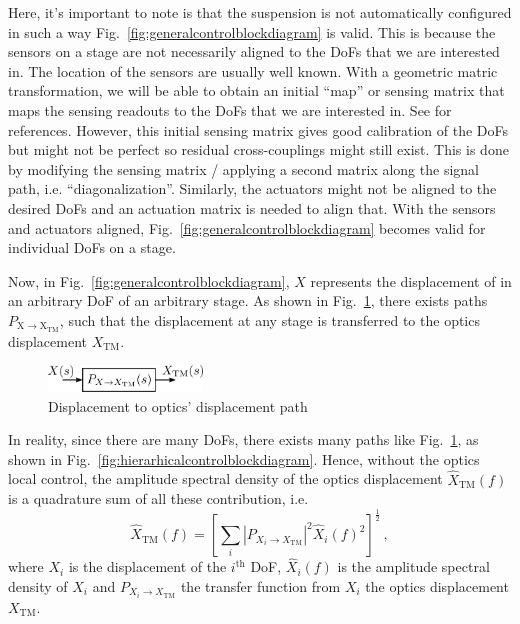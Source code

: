 Here, it's important to note is that the suspension is not automatically configured in such a way Fig.~\ref{fig:generalcontrolblockdiagram} is valid.
This is because the sensors on a stage are not necessarily aligned to the DoFs that we are interested in.
The location of the sensors are usually well known.
With a geometric matric transformation, we will be able to obtain an initial ``map'' or sensing matrix that maps the sensing readouts to the DoFs that we are interested in.
See \cite{bs_suspension_diagonalization, sr_suspension_diagonalization, all_of_the_vibration,  sensing_matrices_oplev} for references.
However, this initial sensing matrix gives good calibration of the DoFs but might not be perfect so residual cross-couplings might still exist.
This is done by modifying the sensing matrix / applying a second matrix along the signal path, i.e. ``diagonalization''.
Similarly, the actuators might not be aligned to the desired DoFs and an actuation matrix is needed to align that.
With the sensors and actuators aligned, Fig.~\ref{fig:generalcontrolblockdiagram} becomes valid for individual DoFs on a stage.

Now, in Fig.~\ref{fig:generalcontrolblockdiagram}, $X$ represents the displacement of in an arbitrary DoF of an arbitrary stage.
As shown in Fig.~\ref{fig:displacementtooptics}, there exists paths $P_\mathrm{X\to X_\mathrm{TM}}$, such that the displacement at any stage is transferred to the optics displacement $X_\mathrm{TM}$.
\begin{figure}[!h]
	\centering
	\includegraphics[width=41mm]{figures/displacement_to_optics}
	\caption{Displacement to optics' displacement path}
	\label{fig:displacementtooptics}
\end{figure}
In reality, since there are many DoFs, there exists many paths like Fig.~\ref{fig:displacementtooptics}, as shown in Fig.~\ref{fig:hierarhicalcontrolblockdiagram}.
Hence, without the optics local control, the amplitude spectral density of the optics displacement $\hat{X}_\mathrm{TM}(f)$ is a quadrature sum of all these contribution, i.e.
\begin{equation}
	\hat{X}_\mathrm{TM}(f)=\left[\sum_i\left\lvert P_{X_i\to X_\mathrm{TM}}\right\rvert^2 \hat{X}_i(f)^2\right]^{\frac{1}{2}}\,,
	\label{eqn:x_tm_asd}
\end{equation}
where $X_i$ is the displacement of the $i^\mathrm{th}$ DoF, $\hat{X}_i(f)$ is the amplitude spectral density of $X_i$ and $P_{X_i\to X_\mathrm{TM}}$ the transfer function from $X_i$ the optics displacement $X_\mathrm{TM}$.

